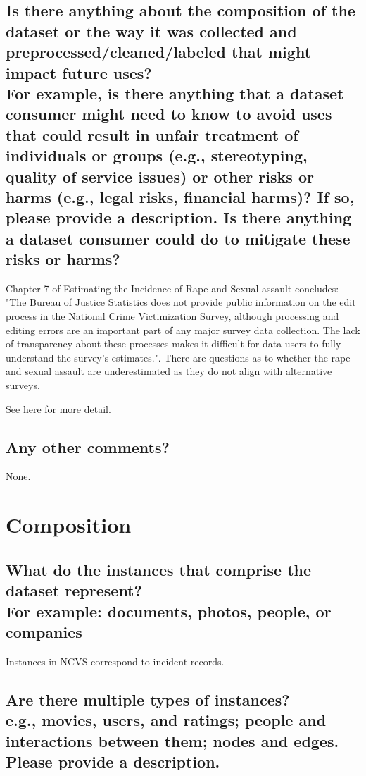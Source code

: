 \documentclass[letterpaper, 10 pt, conference]{ieeeconf}  %
\newcommand{\subtitle}[1]{{\\ \small \normalfont \color{purple} #1}}
\begin{document}
\subsection{Is there anything about the composition of the dataset or the way it was collected and preprocessed/cleaned/labeled that might impact future uses? \subtitle{For example, is there anything that a dataset consumer might need to know to avoid uses that could result in unfair treatment of individuals or groups (e.g., stereotyping, quality of service issues) or other risks or harms (e.g., legal risks, financial harms)? If so, please provide a description. Is there anything a dataset consumer could do to mitigate these risks or harms?}}

Chapter 7 of Estimating the Incidence of Rape and Sexual assault concludes: "The Bureau of Justice Statistics does not provide public information on the edit process in the National Crime Victimization Survey, although processing and editing errors are an important part of any major survey data collection. The lack of transparency about these processes makes it difficult for data users to fully understand the survey's estimates.". There are questions as to whether the rape and sexual assault are underestimated as they do not align with alternative surveys. 

See \href{https://www.ncbi.nlm.nih.gov/books/NBK202273/}{here} for more detail.

\subsection{Any other comments?}

None.

\section{Composition}

\subsection{What do the instances that comprise the dataset represent? \subtitle{For example: documents, photos, people, or companies}}

Instances in NCVS correspond to incident records.

\subsection{Are there multiple types of instances? \subtitle{e.g., movies, users, and ratings; people and interactions between them; nodes and edges. Please provide a description.}}
\end{document}
